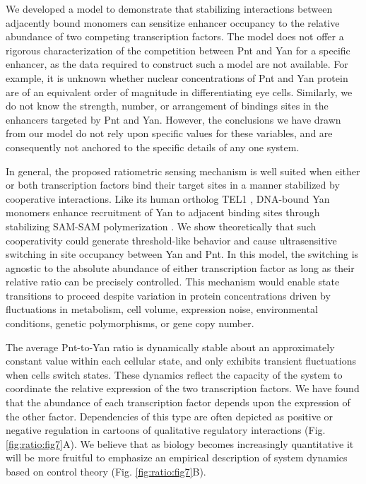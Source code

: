 We developed a model to demonstrate that stabilizing interactions between adjacently bound monomers can sensitize enhancer occupancy to the relative abundance of two competing transcription factors. The model does not offer a rigorous characterization of the competition between Pnt and Yan for a specific enhancer, as the data required to construct such a model are not available. For example, it is unknown whether nuclear concentrations of Pnt and Yan protein are of an equivalent order of magnitude in differentiating eye cells. Similarly, we do not know the strength, number, or arrangement of bindings sites in the enhancers targeted by Pnt and Yan. However, the conclusions we have drawn from our model do not rely upon specific values for these variables, and are consequently not anchored to the specific details of any one system. 

In general, the proposed ratiometric sensing mechanism is well suited when either or both transcription factors bind their target sites in a manner stabilized by cooperative interactions. Like its human ortholog TEL1 \cite{Kim2001}, DNA-bound Yan monomers enhance recruitment of Yan to adjacent binding sites through stabilizing SAM-SAM polymerization \cite{Zhang2010}. We show theoretically that such cooperativity could generate threshold-like behavior and cause ultrasensitive switching in site occupancy between Yan and Pnt. In this model, the switching is agnostic to the absolute abundance of either transcription factor as long as their relative ratio can be precisely controlled. This mechanism would enable state transitions to proceed despite variation in protein concentrations driven by fluctuations in metabolism, cell volume, expression noise, environmental conditions, genetic polymorphisms, or gene copy number.

The average Pnt-to-Yan ratio is dynamically stable about an approximately constant value within each cellular state, and only exhibits transient fluctuations when cells switch states. These dynamics reflect the capacity of the system to coordinate the relative expression of the two transcription factors. We have found that the abundance of each transcription factor depends upon the expression of the other factor. Dependencies of this type are often depicted as positive or negative regulation in cartoons of qualitative regulatory interactions (Fig. \ref{fig:ratio:fig7}A). We believe that as biology becomes increasingly quantitative it will be more fruitful to emphasize an empirical description of system dynamics based on control theory (Fig. \ref{fig:ratio:fig7}B).

